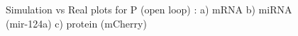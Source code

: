 \documentclass{article}
\begin{document}
\begin{figure}[h!]
\centering
{}
\caption{Simulation vs Real plots for P (open loop) : a) mRNA b) miRNA (mir-124a) c) protein (mCherry)}
\label{resultsP}
\end{figure}
\end{document}
